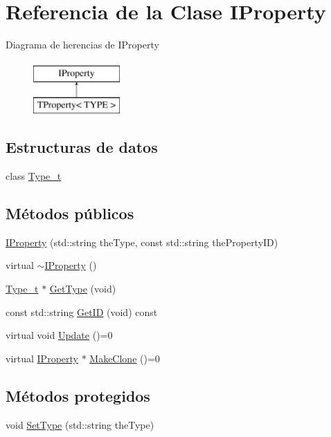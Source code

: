 \hypertarget{classIProperty}{}\section{Referencia de la Clase I\+Property}
\label{classIProperty}
Diagrama de herencias de I\+Property\begin{figure}[H]
\begin{center}
\leavevmode
\includegraphics[height=2.000000cm]{classIProperty}
\end{center}
\end{figure}
\subsection*{Estructuras de datos}
\begin{DoxyCompactItemize}
\item 
class \hyperlink{classIProperty_1_1Type__t}{Type\+\_\+t}
\end{DoxyCompactItemize}
\subsection*{Métodos públicos}
\begin{DoxyCompactItemize}
\item 
\hyperlink{classIProperty_a8d7906c8be889ae2b85cd712071c59a9}{I\+Property} (std\+::string the\+Type, const std\+::string the\+Property\+I\+D)
\item 
virtual \hyperlink{classIProperty_a5f96ff700cd8e9cd86fd009a09b0448a}{$\sim$\+I\+Property} ()
\item 
\hyperlink{classIProperty_1_1Type__t}{Type\+\_\+t} $\ast$ \hyperlink{classIProperty_a1d7350322f5c32e8e67879a5e5475b50}{Get\+Type} (void)
\item 
const std\+::string \hyperlink{classIProperty_af96e4937115a87d7e116df5afbd0ca37}{Get\+I\+D} (void) const 
\item 
virtual void \hyperlink{classIProperty_af257f5c126fedd5ad89726cdeeccbc0a}{Update} ()=0
\item 
virtual \hyperlink{classIProperty}{I\+Property} $\ast$ \hyperlink{classIProperty_a5ae2b99d460cc149f4afa04e9d97d584}{Make\+Clone} ()=0
\end{DoxyCompactItemize}
\subsection*{Métodos protegidos}
\begin{DoxyCompactItemize}
\item 
void \hyperlink{classIProperty_a56dd22e54202123098eafedf52c22feb}{Set\+Type} (std\+::string the\+Type)
\end{DoxyCompactItemize}


